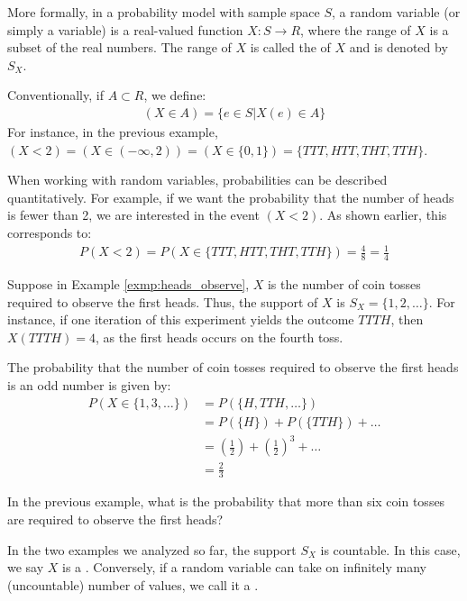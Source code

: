 More formally, in a probability model with sample space \( S \),
a random variable (or simply a variable) is a real-valued function \( X: S \rightarrow R \),
where the range of \( X \) is a subset of the real numbers.
The range of \( X \) is called the  of \( X \) and is denoted by \( S_{X} \).

Conventionally, if \( A \subset R\), we define:
\begin{gather*}
    (X \in A) = \{ e \in S | X(e) \in A \}
\end{gather*}
For instance, in the previous example, \( (X < 2) = (X \in (-\infty, 2)) = (X \in \{ 0, 1 \}) = \{ TTT, HTT, THT, TTH \} \).

When working with random variables, probabilities can be described quantitatively.
For example, if we want the probability that the number of heads is fewer than 2, we are interested in the event \( (X < 2) \).
As shown earlier, this corresponds to:
\begin{gather*}
    P(X < 2) = P(X \in \{ TTT, HTT, THT, TTH \}) = \frac{4}{8} = \frac{1}{4}
\end{gather*}

\begin{exmp}
    Suppose in Example \autoref{exmp:heads_observe}, \( X \) is the number of coin tosses required to observe the first heads.
    Thus, the support of \( X \) is \( S_{X} = \{ 1, 2, \ldots \} \).
    For instance, if one iteration of this experiment yields the outcome \( TTTH \),
    then \( X(TTTH) = 4 \), as the first heads occurs on the fourth toss.

    The probability that the number of coin tosses required to observe the first heads is an odd number is given by:
    \begin{align*}
        P(X \in \{ 1, 3, \ldots \}) &= P(\{ H, TTH, \ldots \})\\
        &= P(\{ H \}) + P(\{ TTH \}) + \ldots\\
        &= (\frac{1}{2}) + (\frac{1}{2})^3 + \ldots\\
        &= \frac{2}{3}
    \end{align*}
\end{exmp}

\begin{exmp}
    In the previous example, what is the probability that more than six coin tosses are required to observe the first heads?
\end{exmp}

In the two examples we analyzed so far, the support \( S_{X} \) is countable.
In this case, we say \( X \) is a .
Conversely, if a random variable can take on infinitely many (uncountable) number of values,
we call it a .

